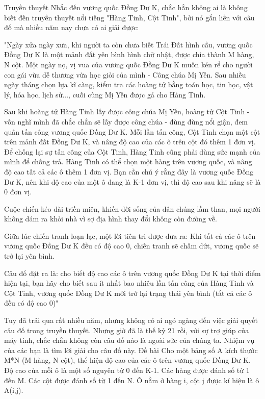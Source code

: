 Truyền thuyết
Nhắc đến vương quốc Đồng Dư K, chắc hẳn không ai là không biết đến truyền thuyết nổi tiếng "Hàng Tinh, Cột Tinh", bởi nó gắn liền với câu đố mà nhiều năm nay chưa có ai giải được:

"Ngày xửa ngày xưa, khi người ta còn chưa biết Trái Đất hình cầu, vương quốc Đồng Dư K là một mảnh đất yên bình hình chữ nhật, được chia thành M hàng, N cột. Một ngày nọ, vị vua của vương quốc Đồng Dư K muốn kén rể cho người con gái vừa dễ thương vừa học giỏi của mình - Công chúa Mị Yến. Sau nhiều ngày tháng chọn lựa kĩ càng, kiểm tra các hoàng tử bằng toán học, tin học, vật lý, hóa học, lịch sử..., cuối cùng Mị Yến được gả cho Hàng Tinh.

Sau khi hoàng tử Hàng Tinh lấy được công chúa Mị Yến, hoàng tử Cột Tinh - vốn nghĩ mình đã chắc chắn sẽ lấy được công chúa - đùng đùng nổi giận, đem quân tấn công vương quốc Đồng Dư K. Mỗi lần tấn công, Cột Tinh chọn một cột trên mảnh đất Đồng Dư K, và nâng độ cao của các ô trên cột đó thêm 1 đơn vị. Để chống lại sự tấn công của Cột Tinh, Hàng Tinh cũng phải dùng sức mạnh của mình để chống trả. Hàng Tinh có thể chọn một hàng trên vương quốc, và nâng độ cao tất cả các ô thêm 1 đơn vị. Bạn cần chú ý rằng đây là vương quốc Đồng Dư K, nên khi độ cao của một ô đang là K-1 đơn vị, thì độ cao sau khi nâng sẽ là 0 đơn vị.

Cuộc chiến kéo dài triền miên, khiến đời sống của dân chúng lầm than, mọi người không dám ra khỏi nhà vì sợ địa hình thay đổi không còn đường về.

Giữa lúc chiến tranh loạn lạc, một lời tiên tri được đưa ra: Khi tất cả các ô trên vương quốc Đồng Dư K đều có độ cao 0, chiến tranh sẽ chấm dứt, vương quốc sẽ trở lại yên bình.

Câu đố đặt ra là: cho biết độ cao các ô trên vương quốc Đồng Dư K tại thời điểm hiện tại, bạn hãy cho biết sau ít nhất bao nhiêu lần tấn công của Hàng Tinh và Cột Tinh, vương quốc Đồng Dư K mới trở lại trạng thái yên bình (tất cả các ô đều có độ cao 0)"

Tuy đã trải qua rất nhiều năm, nhưng không có ai ngó ngàng đến việc giải quyết câu đố trong truyền thuyết. Nhưng giờ đã là thế kỷ 21 rồi, với sự trợ giúp của máy tính, chắc chắn không còn câu đố nào là ngoài sức của chúng ta. Nhiệm vụ của các bạn là tìm lời giải cho câu đố này.
Đề bài
Cho một bảng số A kích thước M*N (M hàng, N cột), thể hiện độ cao của các ô trên vương quốc Đồng Dư K. Độ cao của mỗi ô là một số nguyên từ 0 đến K-1. Các hàng được đánh số từ 1 đến M. Các cột được đánh số từ 1 đến N. Ô nằm ở hàng i, cột j được kí hiệu là ô A(i,j).

